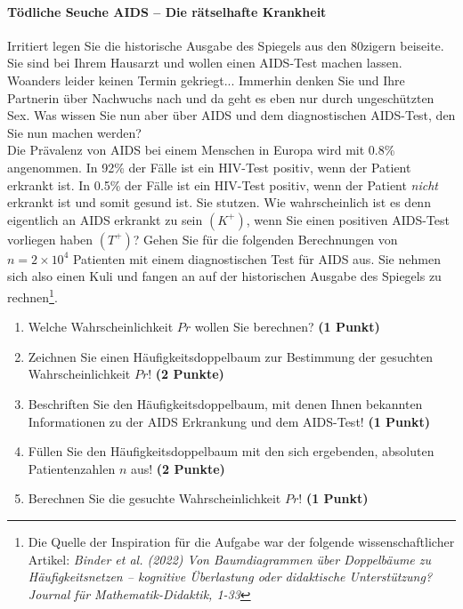 \documentclass[a4paper, 9pt]{scrartcl}\usepackage[]{graphicx}\usepackage[]{xcolor}
\begin{document}
\paragraph{T{\"o}dliche Seuche AIDS -- Die r{\"a}tselhafte Krankheit}




Irritiert legen Sie die historische Ausgabe des Spiegels aus den 80zigern
beiseite. Sie sind bei Ihrem Hausarzt und wollen einen AIDS-Test machen
lassen. Woanders leider keinen Termin gekriegt... Immerhin denken Sie und
Ihre Partnerin {\"u}ber Nachwuchs nach und da geht es eben nur durch
ungesch{\"u}tzten Sex. Was wissen Sie nun aber {\"u}ber AIDS und dem diagnostischen
AIDS-Test, den Sie nun machen werden?\\

Die Pr{\"a}valenz von AIDS bei einem Menschen in Europa wird mit
0.8\% angenommen. In 92\% der F{\"a}lle ist ein
HIV-Test positiv, wenn der Patient erkrankt ist. In 0.5\%
der F{\"a}lle ist ein HIV-Test positiv, wenn der Patient \textit{nicht}
erkrankt ist und somit gesund ist. Sie stutzen. Wie wahrscheinlich ist es
denn eigentlich an AIDS erkrankt zu sein $(K^+)$, wenn Sie einen positiven
AIDS-Test vorliegen haben $(T^+)$? Gehen Sie f{\"u}r die folgenden Berechnungen
von $n = \ensuremath{2\times 10^{4}}$ Patienten mit einem diagnostischen Test f{\"u}r AIDS
aus. Sie nehmen sich also einen Kuli und fangen an auf der historischen
Ausgabe des Spiegels zu rechnen\footnote{Die Quelle der Inspiration f{\"u}r die
  Aufgabe war der folgende wissenschaftlicher Artikel: \textit{Binder et
    al. (2022) Von Baumdiagrammen {\"u}ber Doppelb{\"a}ume zu H{\"a}ufigkeitsnetzen --
    kognitive {\"U}berlastung oder didaktische Unterst{\"u}tzung? Journal f{\"u}r
    Mathematik-Didaktik, 1-33}}.

\begin{enumerate}
\item Welche Wahrscheinlichkeit $Pr$ wollen Sie berechnen? \textbf{(1 Punkt)}
\item Zeichnen Sie einen H{\"a}ufigkeitsdoppelbaum zur Bestimmung der gesuchten
  Wahrscheinlichkeit $Pr$! \textbf{(2 Punkte)} 
\item Beschriften Sie den H{\"a}ufigkeitsdoppelbaum, mit denen Ihnen bekannten
  Informationen zu der AIDS Erkrankung und dem AIDS-Test! \textbf{(1 Punkt)}
\item F{\"u}llen Sie den H{\"a}ufigkeitsdoppelbaum mit den sich ergebenden,
  absoluten Patientenzahlen $n$ aus! \textbf{(2 Punkte)}
\item Berechnen Sie die gesuchte Wahrscheinlichkeit $Pr$! \textbf{(1 Punkt)}
\end{enumerate}
\end{document}
